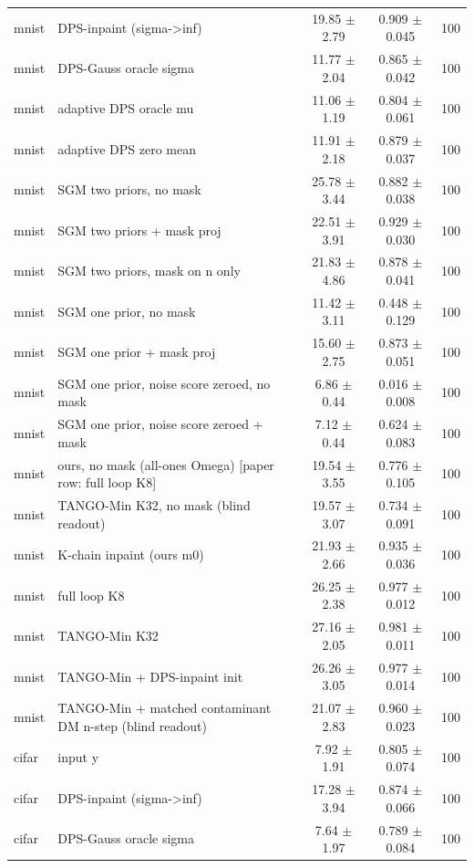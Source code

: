 \begin{tabular}{llccc}
mnist & DPS-inpaint (sigma->inf) & 19.85 $\pm$ 2.79 & 0.909 $\pm$ 0.045 & 100\\
mnist & DPS-Gauss oracle sigma & 11.77 $\pm$ 2.04 & 0.865 $\pm$ 0.042 & 100\\
mnist & adaptive DPS oracle mu & 11.06 $\pm$ 1.19 & 0.804 $\pm$ 0.061 & 100\\
mnist & adaptive DPS zero mean & 11.91 $\pm$ 2.18 & 0.879 $\pm$ 0.037 & 100\\
mnist & SGM two priors, no mask & 25.78 $\pm$ 3.44 & 0.882 $\pm$ 0.038 & 100\\
mnist & SGM two priors + mask proj & 22.51 $\pm$ 3.91 & 0.929 $\pm$ 0.030 & 100\\
mnist & SGM two priors, mask on n only & 21.83 $\pm$ 4.86 & 0.878 $\pm$ 0.041 & 100\\
mnist & SGM one prior, no mask & 11.42 $\pm$ 3.11 & 0.448 $\pm$ 0.129 & 100\\
mnist & SGM one prior + mask proj & 15.60 $\pm$ 2.75 & 0.873 $\pm$ 0.051 & 100\\
mnist & SGM one prior, noise score zeroed, no mask & 6.86 $\pm$ 0.44 & 0.016 $\pm$ 0.008 & 100\\
mnist & SGM one prior, noise score zeroed + mask & 7.12 $\pm$ 0.44 & 0.624 $\pm$ 0.083 & 100\\
mnist & ours, no mask (all-ones Omega) [paper row: full loop K8] & 19.54 $\pm$ 3.55 & 0.776 $\pm$ 0.105 & 100\\
mnist & TANGO-Min K32, no mask (blind readout) & 19.57 $\pm$ 3.07 & 0.734 $\pm$ 0.091 & 100\\
mnist & K-chain inpaint (ours m0) & 21.93 $\pm$ 2.66 & 0.935 $\pm$ 0.036 & 100\\
mnist & full loop K8 & 26.25 $\pm$ 2.38 & 0.977 $\pm$ 0.012 & 100\\
mnist & TANGO-Min K32 & 27.16 $\pm$ 2.05 & 0.981 $\pm$ 0.011 & 100\\
mnist & TANGO-Min + DPS-inpaint init & 26.26 $\pm$ 3.05 & 0.977 $\pm$ 0.014 & 100\\
mnist & TANGO-Min + matched contaminant DM n-step (blind readout) & 21.07 $\pm$ 2.83 & 0.960 $\pm$ 0.023 & 100\\
\midrule
cifar & input y & 7.92 $\pm$ 1.91 & 0.805 $\pm$ 0.074 & 100\\
cifar & DPS-inpaint (sigma->inf) & 17.28 $\pm$ 3.94 & 0.874 $\pm$ 0.066 & 100\\
cifar & DPS-Gauss oracle sigma & 7.64 $\pm$ 1.97 & 0.789 $\pm$ 0.084 & 100\\

\end{tabular}
